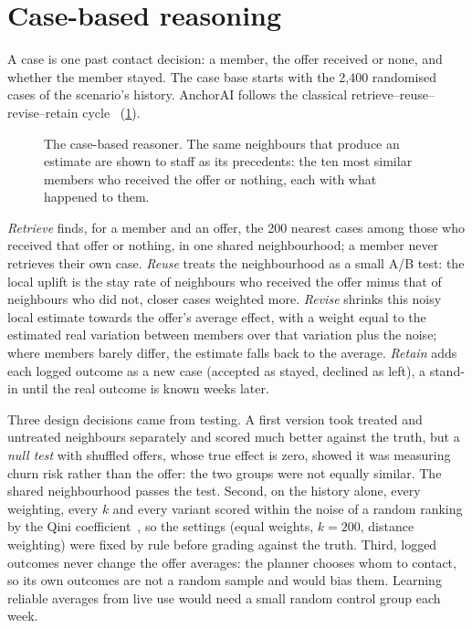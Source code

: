 \section{Case-based reasoning}
\label{sec:cbr}

A case is one past contact decision: a member, the offer received or none, and whether the member stayed. The case base starts with the 2,400 randomised cases of the scenario's history. AnchorAI follows the classical retrieve--reuse--revise--retain cycle~\cite{aamodt1994cbr} (\cref{fig:cbr}).

\begin{figure}[tb]
  \centering
  
  \caption{The case-based reasoner. The same neighbours that produce an estimate are shown to staff as its precedents: the ten most similar members who received the offer or nothing, each with what happened to them.}
  \label{fig:cbr}
\end{figure}

\emph{Retrieve} finds, for a member and an offer, the 200 nearest cases among those who received that offer or nothing, in one shared neighbourhood; a member never retrieves their own case. \emph{Reuse} treats the neighbourhood as a small A/B test: the local uplift is the stay rate of neighbours who received the offer minus that of neighbours who did not, closer cases weighted more. \emph{Revise} shrinks this noisy local estimate towards the offer's average effect, with a weight equal to the estimated real variation between members over that variation plus the noise; where members barely differ, the estimate falls back to the average. \emph{Retain} adds each logged outcome as a new case (accepted as stayed, declined as left), a stand-in until the real outcome is known weeks later.

Three design decisions came from testing. A first version took treated and untreated neighbours separately and scored much better against the truth, but a \emph{null test} with shuffled offers, whose true effect is zero, showed it was measuring churn risk rather than the offer: the two groups were not equally similar. The shared neighbourhood passes the test. Second, on the history alone, every weighting, every $k$ and every variant scored within the noise of a random ranking by the Qini coefficient~\cite{radcliffe2007uplift}, so the settings (equal weights, $k = 200$, distance weighting) were fixed by rule before grading against the truth. Third, logged outcomes never change the offer averages: the planner chooses whom to contact, so its own outcomes are not a random sample and would bias them. Learning reliable averages from live use would need a small random control group each week.

